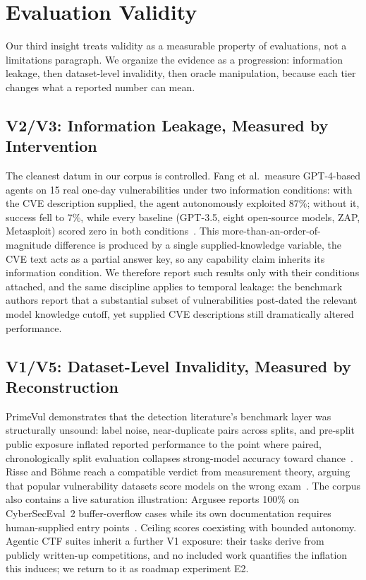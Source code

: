 \documentclass[conference,compsoc]{IEEEtran}
\begin{document}
\vspace{6pt}
\section{Evaluation Validity}
\label{sec:validity}
Our third insight treats validity as a measurable property of evaluations, not a limitations
paragraph. We organize the evidence as a progression: information leakage, then dataset-level
invalidity, then oracle manipulation, because each tier changes what a reported number can
mean.

\subsection{V2/V3: Information Leakage, Measured by Intervention}
The cleanest datum in our corpus is controlled. Fang et al.\ measure GPT-4-based agents on 15
real one-day vulnerabilities under two information conditions: with the CVE description
supplied, the agent autonomously exploited 87\%; without it, success fell to 7\%, while every
baseline (GPT-3.5, eight open-source models, ZAP, Metasploit) scored zero in both
conditions~\cite{fang2024agents}. This more-than-an-order-of-magnitude difference is produced by a single
supplied-knowledge variable, the CVE text acts as a partial answer key, so any
capability claim inherits its information condition. We therefore report such results only with
their conditions attached, and the same discipline applies to temporal leakage: the benchmark
authors report that a substantial subset of vulnerabilities post-dated the relevant model
knowledge cutoff, yet supplied CVE descriptions still dramatically altered performance.

\subsection{V1/V5: Dataset-Level Invalidity, Measured by Reconstruction}
PrimeVul demonstrates that the detection literature's benchmark layer was structurally
unsound: label noise, near-duplicate pairs across splits, and pre-split public exposure
inflated reported performance to the point where paired, chronologically split evaluation
collapses strong-model accuracy toward chance~\cite{primevul2024}. Risse and B\"ohme reach a
compatible verdict from measurement theory, arguing that popular vulnerability datasets score
models on the wrong exam~\cite{rissebohme-wrongexam2024}. The corpus also contains a live saturation
illustration: Argusee reports 100\% on CyberSecEval~2 buffer-overflow cases while its own
documentation requires human-supplied entry points~\cite{darknavyargusee2025}. Ceiling
scores coexisting with bounded autonomy. Agentic CTF suites inherit a further V1 exposure:
their tasks derive from publicly written-up competitions, and no included work quantifies the
inflation this induces; we return to it as roadmap experiment E2.
\end{document}
